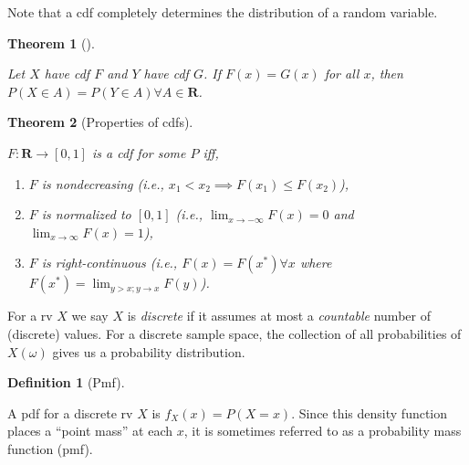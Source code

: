 \documentclass[
  a4paper,
  oneside]{book}
\providecommand{\tightlist}{%
  \setlength{\itemsep}{0pt}\setlength{\parskip}{0pt}}\usepackage{longtable,booktabs,array}
\theoremstyle{definition}
\newtheorem{definition}{Definition}[chapter]
\theoremstyle{definition}
\theoremstyle{definition}
\theoremstyle{plain}
\newtheorem{theorem}{Theorem}[chapter]
\theoremstyle{remark}
\begin{document}
Note that a cdf completely determines the distribution of a random
variable.

\begin{theorem}[]\protect\hypertarget{thm-cdf-determines-dist}{}\label{thm-cdf-determines-dist}

Let \(X\) have cdf \(F\) and \(Y\) have cdf \(G\). If \(F(x) = G(x)\)
for all \(x\), then \(P(X \in A)= P(Y \in A) \forall A \in \mathbf{R}\).

\end{theorem}

\begin{theorem}[Properties of
cdfs]\protect\hypertarget{thm-cdf-properties}{}\label{thm-cdf-properties}

\(F : \mathbf{R} \to [0,1]\) is a cdf for some \(P\) iff,

\begin{enumerate}
\def\labelenumi{\arabic{enumi}.}
\tightlist
\item
  \(F\) is nondecreasing (i.e.,
  \(x_1 < x_2 \implies F(x_1) \leq F(x_2)\)),
\item
  \(F\) is normalized to \([0,1]\) (i.e.,
  \(\lim_{x \to -\infty} F(x) = 0\) and
  \(\lim_{x \to \infty} F(x) = 1\)),
\item
  \(F\) is right-continuous (i.e., \(F(x) = F(x^*) \forall x\) where
  \(F(x^*) = \lim_{y > x; y \to x} F(y)\)).
\end{enumerate}

\end{theorem}

For a rv \(X\) we say \(X\) is \emph{discrete} if it assumes at most a
\emph{countable} number of (discrete) values. For a discrete sample
space, the collection of all probabilities of \(X(\omega)\) gives us a
probability distribution.

\begin{definition}[Pmf]\protect\hypertarget{def-pmf}{}\label{def-pmf}

A pdf for a discrete rv \(X\) is \(f_X(x) = P(X = x)\). Since this
density function places a ``point mass'' at each \(x\), it is sometimes
referred to as a probability mass function (pmf).

\end{definition}
\end{document}
